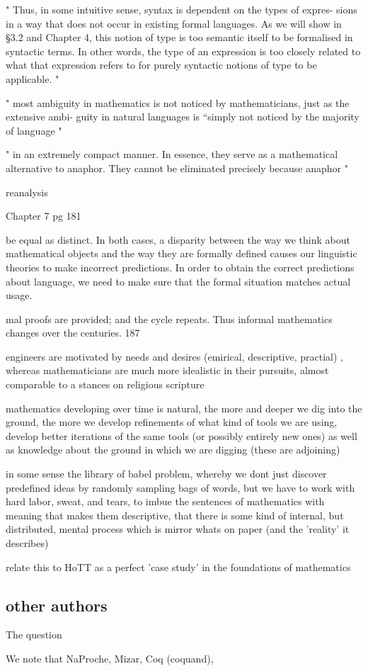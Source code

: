 "
Thus, in some intuitive sense, syntax is dependent on the types of expres-
sions in a way that does not occur in existing formal languages. As we will
show in §3.2 and Chapter 4, this notion of type is too semantic itself to be
formalised in syntactic terms. In other words, the type of an expression is too
closely related to what that expression refers to for purely syntactic notions
of type to be applicable.
"

"
most ambiguity in mathematics is not noticed by mathematicians, just as the extensive ambi-
guity in natural languages is “simply not noticed by the majority of language
"

"
in an extremely compact manner. In essence, they serve as a mathematical
alternative to anaphor. They cannot be eliminated precisely because anaphor
"

reanalysis

Chapter 7 pg 181

be equal as distinct. In both cases, a disparity between the way we think
about mathematical objects and the way they are formally defined causes
our linguistic theories to make incorrect predictions. In order to obtain the
correct predictions about language, we need to make sure that the formal
situation matches actual usage.

mal proofs are provided; and the cycle repeats. Thus informal mathematics
changes over the centuries. 187

engineers are motivated by needs and desires (emirical, descriptive,
practial) , whereas mathematicians are much more idealistic in their pursuits,
almost comparable to a stances on religious scripture

mathematics developing over time is natural, the more and deeper we dig into the
ground, the more we develop refinements of what kind of tools we are using,
develop better iterations of the same tools (or possibly entirely new ones) as
well as knowledge about the ground in which we are digging (these are adjoining)

in some sense the library of babel problem, whereby we dont just discover
predefined ideas by randomly sampling bags of words, but we have to work with
hard labor, sweat, and tears, to imbue the sentences of mathematics with meaning
that makes them descriptive, that there is some kind of internal, but
distributed, mental process which is mirror whats on paper (and the 'reality' it
describes)

relate this to HoTT as a perfect 'case study' in the foundations of mathematics


\subsection{other authors}

The question 

We note that 
NaProche, Mizar, Coq (coquand), 
